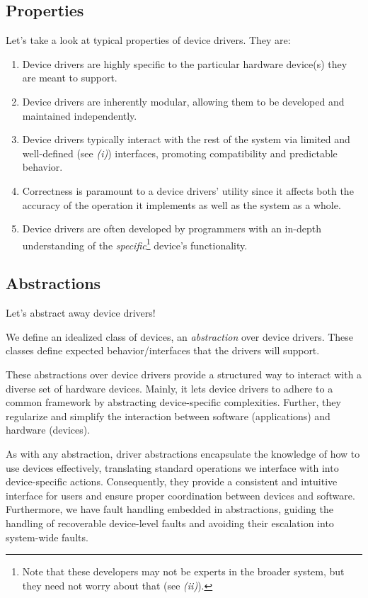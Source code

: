 \documentclass{report}
\newcommand{\abstractionBegin}[1]{\begin{tcolorbox}[colback=violet!5!white,colframe=violet,title={Abstraction:
      #1}]}
\newcommand{\abstractionEnd}{\end{tcolorbox}}
\begin{document}
\subsection{Properties}
Let's take a look at typical properties of device drivers. They are:

\begin{enumerate}[label=\textit{(\roman*)}]
\item Device drivers are highly specific to the particular hardware device(s) they are meant to
  support.
\item Device drivers are inherently modular, allowing them to be developed and maintained independently.
\item Device drivers typically interact with the rest of the system via limited and well-defined
  (see \textit{(i)}) interfaces, promoting compatibility and predictable behavior.
\item Correctness is paramount to a device drivers' utility since it affects both the accuracy of
  the operation it implements as well as the system as a whole.
\item Device drivers are often developed by programmers with an in-depth understanding of the
  \textit{specific}\footnote{Note that these developers may not be experts in the broader system, but they
    need not worry about that (see \textit{(ii)}).} device's functionality.
\end{enumerate}


\subsection{Abstractions}
Let's abstract away device drivers!

\abstractionBegin{Driver Abstractions}
We define an idealized class of devices, an \textit{abstraction} over device drivers. These classes
define expected behavior/interfaces that the drivers will support.
\abstractionEnd

These abstractions over device drivers provide a structured way to interact with a diverse set of
hardware devices. Mainly, it lets device drivers to adhere to a common framework by abstracting
device-specific complexities. Further, they regularize and simplify the interaction between software
(applications) and hardware (devices).

As with any abstraction, driver abstractions encapsulate the knowledge of how to use devices
effectively, translating standard operations we interface with into device-specific
actions. Consequently, they provide a consistent and intuitive interface for users and ensure proper
coordination between devices and software. Furthermore, we have fault handling embedded in
abstractions, guiding the handling of recoverable device-level faults and avoiding their escalation into
system-wide faults.
\end{document}
